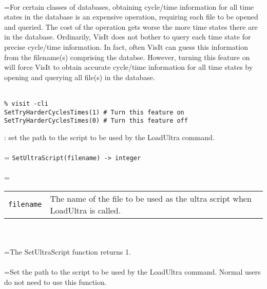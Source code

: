 \documentclass[10pt,a4paper]{report}
\begin{document}
 \\ 
\hangindent=\parindent For certain classes of databases, obtaining cycle/time information for all time states in the database is an expensive operation, requiring each file to be opened and queried. The cost of the operation gets worse the more time states there are in the database. Ordinarily, VisIt does not bother to query each time state for precise cycle/time information. In fact, often VisIt can guess this information from the filename(s) comprising the databse. However, turning this feature on will force VisIt to obtain accurate cycle/time information for all time states by opening and querying all file(s) in the database. \\[-3mm] 

\\[-6mm]
\begin{verbatim}% visit -cli
SetTryHarderCyclesTimes(1) # Turn this feature on
SetTryHarderCyclesTimes(0) # Turn this feature off
\end{verbatim}
\newpage


{}
: set the path to the script to be used by the LoadUltra command.\\[-3mm]

 \\ 
\hangindent=\parindent 
\verb!SetUltraScript(filename) -> integer!\\ [-3mm]

 \\ 
\hangindent=\parindent 
\begin{tabular}{lp{9cm}}
\verb!filename! & The name of the file to be used as the ultra script when LoadUltra is called. \\
\end{tabular} \\[-2mm]


 \\ 
\hangindent=\parindent The SetUltraScript function returns 1. \\[-3mm] 

 \\ 
\hangindent=\parindent Set the path to the script to be used by the LoadUltra command. Normal users do not need to use this function. \\[-3mm] 

\newpage
\end{document}
